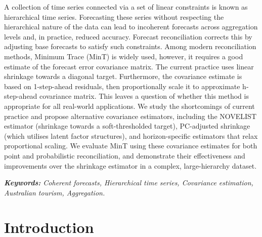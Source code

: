 \documentclass[
  11pt,
  letterpaper,
  DIV=11,
  numbers=noendperiod,
  titlepage]{scrartcl}
\begin{document}
A collection of time series connected via a set of linear constraints is
known as hierarchical time series. Forecasting these series without
respecting the hierarchical nature of the data can lead to incoherent
forecasts across aggregation levels and, in practice, reduced accuracy.
Forecast reconciliation corrects this by adjusting base forecasts to
satisfy such constraints. Among modern reconciliation methods, Minimum
Trace (MinT) is widely used, however, it requires a good estimate of the
forecast error covariance matrix. The current practice uses linear
shrinkage towards a diagonal target. Furthermore, the covariance
estimate is based on 1-step-ahead residuals, then proportionally scale
it to approximate h-step-ahead covariance matrix. This leaves a question
of whether this method is appropriate for all real-world applications.
We study the shortcomings of current practice and propose alternative
covariance estimators, including the NOVELIST estimator (shrinkage
towards a soft-thresholded target), PC-adjusted shrinkage (which
utilises latent factor structures), and horizon-specific estimators that
relax proportional scaling. We evaluate MinT using these covariance
estimates for both point and probabilistic reconciliation, and
demonstrate their effectiveness and improvements over the shrinkage
estimator in a complex, large-hierarchy dataset.

\vspace{1cm}

\emph{\textbf{Keywords:} Coherent forecasts, Hierarchical time series,
Covariance estimation, Australian tourism, Aggregation.}

\pagebreak

\clearpage
\tableofcontents
\clearpage

\section{Introduction}\label{introduction}
\end{document}
